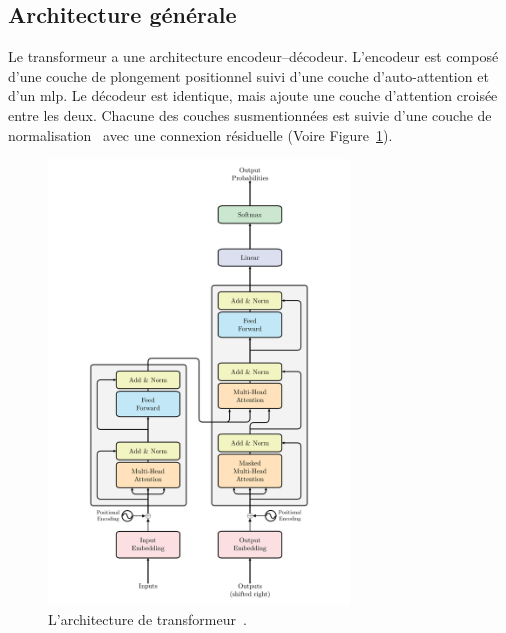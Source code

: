 \subsection{Architecture générale}

Le transformeur a une architecture encodeur--décodeur.
L'encodeur est composé d'une couche de plongement positionnel 
suivi d'une couche d'auto-attention et d'un \gls{mlp}.
Le décodeur est identique, mais ajoute une couche d'attention croisée entre les deux. 
Chacune des couches susmentionnées est suivie d'une couche de normalisation~\cite{Ba_Kiros_Hinton_2016}
avec une connexion résiduelle (Voire Figure~\ref{fig.transformer}).

\begin{figure}[htb]
    \centering
    \includegraphics[width=8cm]{assets/images/transformer.png}
    \caption[L'architecture de transformeur.]
    {L'architecture de transformeur~\cite[Fig 1]{attention}.}
    \label{fig.transformer}
\end{figure}
